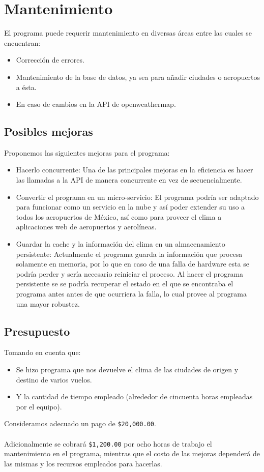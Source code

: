 \documentclass{report}
\begin{document}
\section*{Mantenimiento}
El programa puede requerir mantenimiento en diversas áreas entre las cuales se encuentran:
\begin{itemize}
    \item Corrección de errores.
    \item Mantenimiento de la base de datos, ya sea para añadir ciudades o aeropuertos a ésta.
    \item En caso de cambios en la API de openweathermap.
\end{itemize}
\subsection*{Posibles mejoras}
Proponemos las siguientes mejoras para el programa:
\begin{itemize}
    \item Hacerlo concurrente: Una de las principales mejoras en la eficiencia es hacer las llamadas a la API de manera concurrente en vez de secuencialmente.
    \item Convertir el programa en un micro-servicio: El programa podría ser adaptado para funcionar como un servicio en la nube y así poder extender su uso a todos los aeropuertos de México, así como para proveer el clima a aplicaciones web de aeropuertos y aerolíneas.
    \item Guardar la cache y la información del clima en un almacenamiento persistente: Actualmente el programa guarda la información que procesa solamente en memoria, por lo que en caso de una falla de hardware esta se podría perder y sería necesario reiniciar el proceso. Al hacer el programa persistente se se podría recuperar el estado en el que se encontraba el programa antes antes de que ocurriera la falla, lo cual provee al programa una mayor robustez.
\end{itemize}

\subsection*{Presupuesto}
Tomando en cuenta que: 
\begin{itemize}
    \item Se hizo programa que nos devuelve el clima de las ciudades de origen y destino de varios vuelos.
    \item Y la cantidad de tiempo empleado (alrededor de cincuenta horas empleadas por el equipo).
\end{itemize}

Consideramos adecuado un pago de \texttt{\$20,000.00}.
\\ \\
Adicionalmente se cobrará \texttt{\$1,200.00} por ocho horas de trabajo el mantenimiento en el programa, mientras que el costo de las mejoras dependerá de las mismas y los recursos empleados para hacerlas.


\end{document}
